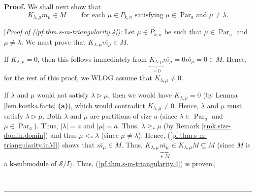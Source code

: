 \documentclass[numbers=enddot,12pt,final,onecolumn,notitlepage]{scrartcl}%
\theoremstyle{definition}
\newenvironment{proof}[1][Proof]{\noindent\textbf{#1.} }{\ \rule{0.5em}{0.5em}}
\begin{document}
\begin{proof}
We shall next show that%
\begin{equation}
K_{\lambda,\mu}\overline{m_{\mu}}\in M\ \ \ \ \ \ \ \ \ \ \text{for each }%
\mu\in P_{k,n}\text{ satisfying }\mu\in\operatorname*{Par}\nolimits_{a}\text{
and }\mu\neq\lambda. \label{pf.thm.s-m-triangularity.4}%
\end{equation}


[\textit{Proof of (\ref{pf.thm.s-m-triangularity.4}):} Let $\mu\in P_{k,n}$ be
such that $\mu\in\operatorname*{Par}\nolimits_{a}$ and $\mu\neq\lambda$. We
must prove that $K_{\lambda,\mu}\overline{m_{\mu}}\in M$.

If $K_{\lambda,\mu}=0$, then this follows immediately from
$\underbrace{K_{\lambda,\mu}}_{=0}\overline{m_{\mu}}=0\overline{m_{\mu}}=0\in
M$. Hence, for the rest of this proof, we WLOG assume that $K_{\lambda,\mu
}\neq0$.

If $\lambda$ and $\mu$ would not satisfy $\lambda\triangleright\mu$, then we
would have $K_{\lambda,\mu}=0$ (by Lemma \ref{lem.kostka.facts} \textbf{(a)}),
which would contradict $K_{\lambda,\mu}\neq0$. Hence, $\lambda$ and $\mu$ must
satisfy $\lambda\triangleright\mu$. Both $\lambda$ and $\mu$ are partitions of
size $a$ (since $\lambda\in\operatorname*{Par}\nolimits_{a}$ and $\mu
\in\operatorname*{Par}\nolimits_{a}$). Thus, $\left\vert \lambda\right\vert
=a$ and $\left\vert \mu\right\vert =a$. Thus, $\lambda\geq_{\ast}\mu$ (by
Remark \ref{rmk.size-domin.domin}) and thus $\mu<_{\ast}\lambda$ (since
$\mu\neq\lambda$). Hence, (\ref{pf.thm.s-m-triangularity.inM}) shows that
$\overline{m_{\mu}}\in M$. Thus, $K_{\lambda,\mu}\underbrace{\overline{m_{\mu
}}}_{\in M}\in K_{\lambda,\mu}M\subseteq M$ (since $M$ is a $\mathbf{k}%
$-submodule of $\mathcal{S}/I$). Thus, (\ref{pf.thm.s-m-triangularity.4}) is proven.]


\end{proof}
\end{document}
